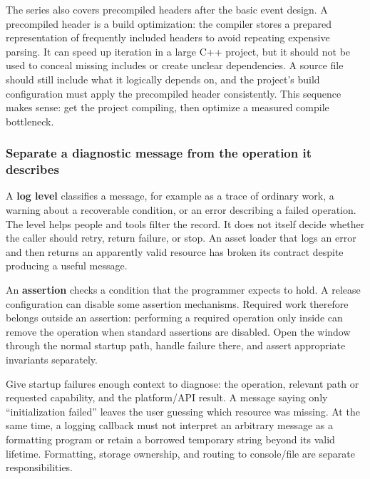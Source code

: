 The series also covers precompiled headers after the basic event design. A precompiled header is a build optimization: the compiler stores a prepared representation of frequently included headers to avoid repeating expensive parsing. It can speed up iteration in a large C++ project, but it should not be used to conceal missing includes or create unclear dependencies. A source file should still include what it logically depends on, and the project's build configuration must apply the precompiled header consistently. This sequence makes sense: get the project compiling, then optimize a measured compile bottleneck.

\subsubsection{Separate a diagnostic message from the operation it describes}\label{05-engine-i-ch013-separate-a-diagnostic-message-from-the-operation-it-describes}

\hypertarget{05-engine-i-ch013-separate-a-diagnostic-message-from-the-operation-it-describes}{}

A \textbf{log level} classifies a message, for example as a trace of ordinary work, a warning about a recoverable condition, or an error describing a failed operation. The level helps people and tools filter the record. It does not itself decide whether the caller should retry, return failure, or stop. An asset loader that logs an error and then returns an apparently valid resource has broken its contract despite producing a useful message.

An \textbf{assertion} checks a condition that the programmer expects to hold. A release configuration can disable some assertion mechanisms. Required work therefore belongs outside an assertion: performing a required operation only inside  can remove the operation when standard assertions are disabled. Open the window through the normal startup path, handle failure there, and assert appropriate invariants separately.

Give startup failures enough context to diagnose: the operation, relevant path or requested capability, and the platform/API result. A message saying only ``initialization failed'' leaves the user guessing which resource was missing. At the same time, a logging callback must not interpret an arbitrary message as a formatting program or retain a borrowed temporary string beyond its valid lifetime. Formatting, storage ownership, and routing to console/file are separate responsibilities.

